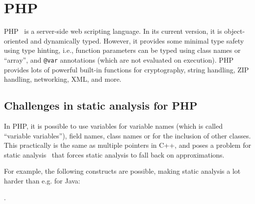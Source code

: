 \chapter{PHP}
\label{php}

PHP~\cite{php-in-action} is a server-side web scripting language. In its current version, it is object-oriented and dynamically typed. However, it provides some minimal type safety using type hinting, i.e., function parameters can be typed using class names or ``array'',  and \texttt{@var} annotations (which are not evaluated on execution). PHP provides lots of powerful built-in functions for cryptography, string handling, ZIP handling, networking, XML, and more.

\section{Challenges in static analysis for PHP}

In PHP, it is possible to use variables for variable names (which is called ``variable variables''), field names, class names or for the inclusion of other classes. This practically is the same as multiple pointers in C++, and poses a problem for static analysis~\cite{tamper-resistance} that forces static analysis to fall back on approximations.

For example, the following constructs are possible, making static analysis a lot harder than e.g. for Java:


.


